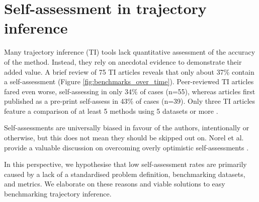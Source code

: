 
\section{Self-assessment in trajectory inference}
Many trajectory inference (TI) tools lack quantitative assessment of the accuracy of the method. Instead, they rely on anecdotal evidence to demonstrate their added value. A brief review of 75 TI articles reveals that only about 37\% contain a self-assessment (Figure \ref{fig:benchmarks_over_time}). Peer-reviewed TI articles fared even worse, self-assessing in only 34\% of cases (n=55), whereas articles first published as a pre-print self-assess in 43\% of cases (n=39). Only three TI articles feature a comparison of at least 5 methods using 5 datasets or more \cite{sharma_forksfindingorderings_2017,guo_hoplandsinglecellpseudotime_2017,parra_reconstructingcomplexlineage_2018}.

Self-assessments are universally biased in favour of the authors, intentionally or otherwise, but this does not mean they should be skipped out on. Norel et al. provide a valuable discussion on overcoming overly optimistic self-assessments \cite{norel_selfassessmenttrapcan_2011}.

In this perspective, we hypothesise that low self-assessment rates are primarily caused by a lack of a standardised problem definition, benchmarking datasets, and metrics. 
We elaborate on these reasons and viable solutions to easy benchmarking trajectory inference.

